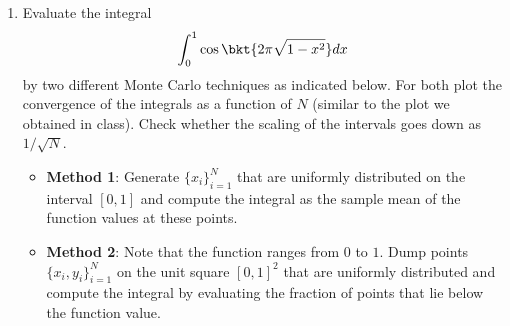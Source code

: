 \documentclass{article}
\begin{document}
\begin{enumerate}
		\item
		Evaluate the integral $$\int_0^1 \cos \bkt{2\pi \sqrt{1-x^2}}dx$$ by two different Monte Carlo techniques as indicated below. For both plot the convergence of the integrals as a function of $N$ (similar to the plot we obtained in class). Check whether the scaling of the intervals goes down as $1/\sqrt{N}$.
		\begin{itemize}
			\item
			\textbf{Method 1}: Generate $\{x_i\}_{i=1}^N$ that are uniformly distributed on the interval $[0,1]$ and compute the integral as the sample mean of the function values at these points.
			\item
			\textbf{Method 2}: Note that the function ranges from $0$ to $1$. Dump points $\{x_i,y_i\}_{i=1}^N$ on the unit square $[0,1]^2$ that are uniformly distributed and compute the integral by evaluating the fraction of points that lie below the function value.
		\end{itemize}
	\end{enumerate}
\end{document}
